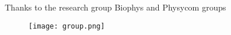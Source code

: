 \documentclass[10pt, technote, oribibl, unicode]{beamer}
\begin{document}
\begin{frame}{\hspace{1cm} Thanks to the research group}{\hspace{2cm} Biophys and Physycom groups}

  \begin{figure}
    \centering
    \texttt{[image: group.png]}
  \end{figure}

\end{frame}
\end{document}
